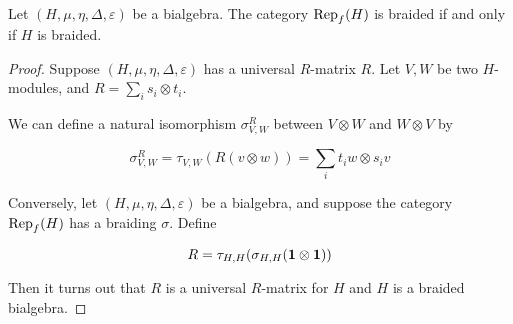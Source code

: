 \begin{theorem}
    Let $(H, \mu, \eta, \Delta, \varepsilon)$ be a bialgebra. The category $\operatorname{Rep}_f(H)$ is braided if and only if $H$ is braided. 
\end{theorem}
\begin{proof}
    Suppose $(H, \mu, \eta, \Delta, \varepsilon)$ has a universal $R$-matrix $R$. Let $V,W$ be two $H$-modules, and $R = \sum_{i} s_i \otimes t_i$. 

    We can define a natural isomorphism $\sigma_{V,W}^R$ between $V \otimes W$ and $W \otimes V$ by

    \begin{equation}
        \sigma_{V,W}^R = \tau_{V,W}(R(v \otimes w)) = \sum_{i} t_i w \otimes s_i v
    \end{equation}

    Conversely, let $(H, \mu, \eta, \Delta, \varepsilon)$ be a bialgebra, and suppose the category $\operatorname{Rep}_f(H)$ has a braiding $\sigma$. Define 

    \begin{equation}
        R = \tau_{H,H}(\sigma_{H,H}(\mathbf{1} \otimes \mathbf{1}))
    \end{equation}

    Then it turns out that $R$ is a universal $R$-matrix for $H$ and $H$ is a braided bialgebra.
\end{proof}


